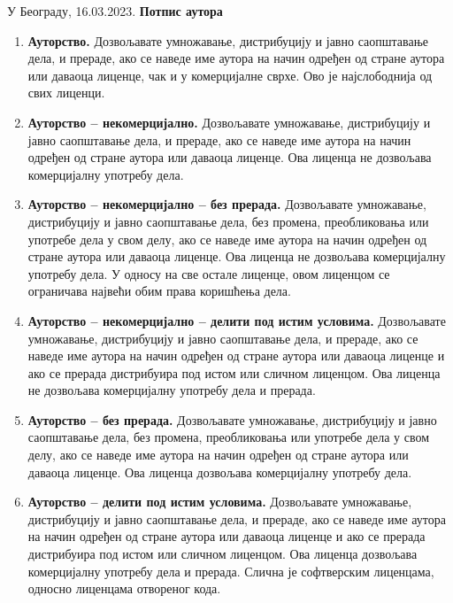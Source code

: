 \vfill

 
У Београду, 16.03.2023.  \hfill  \textbf{Потпис
аутора\hspace{2cm}\mbox{}}

\vspace{.5cm}
\hspace{10cm}\hrulefill 

\hspace{\fill}

\pagebreak
\thispagestyle{empty}


\begin{enumerate}[leftmargin=0.5cm]
\item \textbf{Ауторство.} Дозвољавате умножавање, дистрибуцију и јавно 
саопштавање дела, и 
прераде, ако се наведе име аутора на начин одређен од стране аутора или даваоца 
лиценце, чак и у комерцијалне сврхе. Ово је најслободнија од свих лиценци.
\item \textbf{Ауторство -- некомерцијално.} Дозвољавате умножавање, 
дистрибуцију и јавно 
саопштавање дела, и прераде, ако се наведе име аутора на начин одређен од 
стране 
аутора или даваоца лиценце. Ова лиценца не дозвољава комерцијалну употребу дела.
\item \textbf{Ауторство -- некомерцијално -- без прерада.} Дозвољавате 
умножавање, 
дистрибуцију и јавно саопштавање дела, без промена, преобликовања или употребе 
дела у свом делу, ако се наведе име аутора на начин одређен од стране аутора 
или 
даваоца лиценце. Ова лиценца не дозвољава комерцијалну употребу дела. У односу 
на све остале лиценце, овом лиценцом се ограничава највећи обим права коришћења 
дела. 
\item \textbf{Ауторство -- некомерцијално -- делити под истим условима.} 
Дозвољавате умножавање, дистрибуцију и јавно саопштавање дела, и прераде, ако се 
наведе име 
аутора на начин одређен од стране аутора или даваоца лиценце и ако се прерада 
дистрибуира под истом или сличном лиценцом. Ова лиценца не дозвољава 
комерцијалну употребу дела и прерада.
\item \textbf{Ауторство -- без прерада.} Дозвољавате умножавање, дистрибуцију и 
јавно 
саопштавање дела, без промена, преобликовања или употребе дела у свом делу, ако 
се наведе име аутора на начин одређен од стране аутора или даваоца лиценце. Ова 
лиценца дозвољава комерцијалну употребу дела.
\item \textbf{Ауторство -- делити под истим условима.} Дозвољавате умножавање, 
дистрибуцију и 
јавно саопштавање дела, и прераде, ако се наведе име аутора на начин одређен од 
стране аутора или даваоца лиценце и ако се прерада дистрибуира под истом или 
сличном лиценцом. Ова лиценца дозвољава комерцијалну употребу дела и прерада. 
Слична је софтверским лиценцама, односно лиценцама отвореног кода.               
\end{enumerate}
